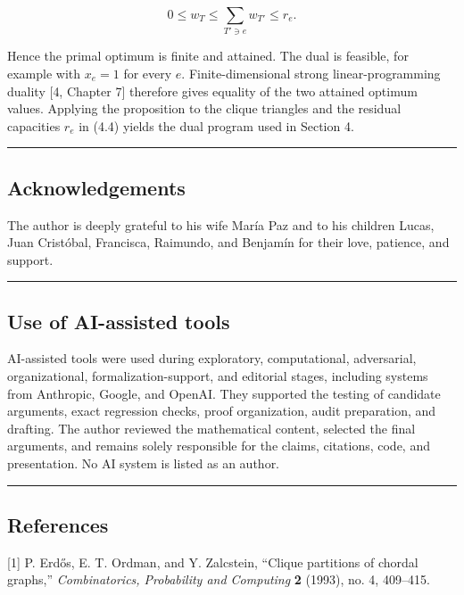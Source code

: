 \documentclass[english,11pt,a4paper]{article}
\begin{document}
\[
0\le w_T\le\sum_{T'\ni e}w_{T'}\le r_e.
\]

Hence the primal optimum is finite and attained. The dual is feasible,
for example with \(x_e=1\) for every \(e\). Finite-dimensional strong
linear-programming duality {[}4, Chapter 7{]} therefore gives equality
of the two attained optimum values. Applying the proposition to the
clique triangles and the residual capacities \(r_e\) in (4.4) yields the
dual program used in Section 4.

\begin{center}\rule{0.5\linewidth}{0.5pt}\end{center}

\subsection{Acknowledgements}\label{acknowledgements}

The author is deeply grateful to his wife María Paz and to his children
Lucas, Juan Cristóbal, Francisca, Raimundo, and Benjamín for their love,
patience, and support.

\begin{center}\rule{0.5\linewidth}{0.5pt}\end{center}

\subsection{Use of AI-assisted tools}\label{use-of-ai-assisted-tools}

AI-assisted tools were used during exploratory, computational,
adversarial, organizational, formalization-support, and editorial
stages, including systems from Anthropic, Google, and OpenAI. They
supported the testing of candidate arguments, exact regression checks,
proof organization, audit preparation, and drafting. The author reviewed
the mathematical content, selected the final arguments, and remains
solely responsible for the claims, citations, code, and presentation. No
AI system is listed as an author.

\begin{center}\rule{0.5\linewidth}{0.5pt}\end{center}

\subsection{References}\label{references}

{[}1{]} P. Erdős, E. T. Ordman, and Y. Zalcstein, ``Clique partitions of
chordal graphs,'' \emph{Combinatorics, Probability and Computing}
\textbf{2} (1993), no. 4, 409--415.
\end{document}
